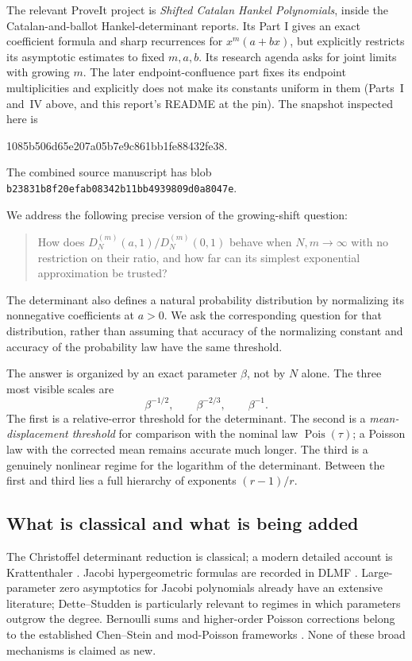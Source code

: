 \documentclass[11pt,a4paper]{article}
\numberwithin{equation}{section}
\theoremstyle{definition}
\theoremstyle{remark}
\newcommand{\Pois}{\operatorname{Pois}}
\begin{document}
The relevant ProveIt project is \emph{Shifted Catalan Hankel Polynomials},
inside the Catalan-and-ballot Hankel-determinant reports. Its Part I gives
an exact coefficient formula and sharp recurrences for
$x^m(a+bx)$, but explicitly restricts its asymptotic estimates to fixed
$m,a,b$. Its research agenda asks for joint limits with growing $m$.
The later endpoint-confluence part fixes its endpoint multiplicities and
explicitly does not make its constants uniform in them
(Parts~I and~IV above, and this report's README at the pin). The snapshot
inspected here is
\begin{center}\small\ttfamily
1085b506d65e207a05b7e9c861bb1fe88432fe38.
\end{center}
The combined source manuscript has blob
\texttt{b23831b8f20efab08342b11bb4939809d0a8047e}.

We address the following precise version of the growing-shift question:
\begin{quote}
How does $D_N^{(m)}(a,1)/D_N^{(m)}(0,1)$ behave when $N,m\to\infty$
with no restriction on their ratio, and how far can its simplest
exponential approximation be trusted?
\end{quote}
The determinant also defines a natural probability distribution by
normalizing its nonnegative coefficients at $a>0$. We ask the corresponding
question for that distribution, rather than assuming that accuracy of the
normalizing constant and accuracy of the probability law have the same
threshold.

The answer is organized by an exact parameter $\beta$, not by $N$ alone.
The three most visible scales are
\begin{equation}\label{gs:eq:three-scales}
 \beta^{-1/2},\qquad \beta^{-2/3},\qquad \beta^{-1}.
\end{equation}
The first is a relative-error threshold for the determinant. The second is
a \emph{mean-displacement threshold} for comparison with the nominal law
$\Pois(\tau)$; a Poisson law with the corrected mean remains accurate much
longer. The third is a genuinely nonlinear regime for the logarithm of the
determinant. Between the first and third lies a full hierarchy of exponents
$(r-1)/r$.

\subsection{What is classical and what is being added}\label{gs:sec:classical}

The Christoffel determinant reduction is classical; a modern detailed
account is Krattenthaler \cite{Krattenthaler2023}. Jacobi hypergeometric formulas
are recorded in DLMF \cite{DLMF}. Large-parameter zero asymptotics for Jacobi
polynomials already have an extensive literature; Dette--Studden
\cite{DetteStudden1994} is particularly relevant to regimes in which parameters
outgrow the degree. Bernoulli sums and higher-order Poisson corrections
belong to the established Chen--Stein and mod-Poisson frameworks
\cite{BarbourHall1984,MeliotNikeghbaliVisentin2022}. None of these broad mechanisms is claimed as new.
\end{document}
